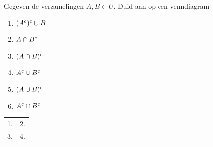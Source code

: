 \begin{oef}
Gegeven de verzamelingen $A,B\subset U$. Duid aan op een venndiagram
\begin{enumerate}
  \item $(A^c)^c \cup B$
  \item $A\cap  B^c$
  \item $(A\cap B)^c$
  \item $A^c \cup  B^c$
  \item $(A\cup B)^c$
  \item $A^c \cap B^c$
\end{enumerate}

\begin{opl}
{
\def\labels{
  \node[anchor=south east] at (-1.55,.6) {$A$};
  \node[anchor=south west] at (1.55,.6) {$B$};
}
\def\universe{(-2.5,-1.5) rectangle +(5,3)}
\def\ellA{(-.9,0) ellipse (1.25cm and 0.75cm)}
\def\ellB{(.9,0) ellipse (1.25cm and 0.75cm)}

\begin{center}
\begin{tabular}{cc}
  1.
  \begin{tikzpicture}
    \draw[thick] \universe;
    \draw[highlight] \ellA;
    \draw[highlight] \ellB;
    \draw[outline] \ellA;
    \labels
  \end{tikzpicture}
  &
  2.
  \begin{tikzpicture}
    \draw[thick] \universe;
    \draw[highlight] \ellA;
    \draw[empty] \ellB;
    \draw[outline] \ellA;
    \labels
  \end{tikzpicture}
  \\
  3.
  \begin{tikzpicture}
    \draw[thick,highlight] \universe;
    \begin{scope}
      \clip \ellA;
      \clip \ellB;
      \draw[empty] \ellA;
    \end{scope}

    \draw[outline] \ellA;
    \draw[outline] \ellB;
    \labels
  \end{tikzpicture}
  &
  4.
  \begin{tikzpicture}
    \draw[thick,highlight] \universe;
    \begin{scope}
      \clip \ellA;
      \clip \ellB;
      \draw[empty] \ellA;
    \end{scope}


\end{tikzpicture}
\end{tabular}
\end{center}}
\end{opl}
\end{oef}

